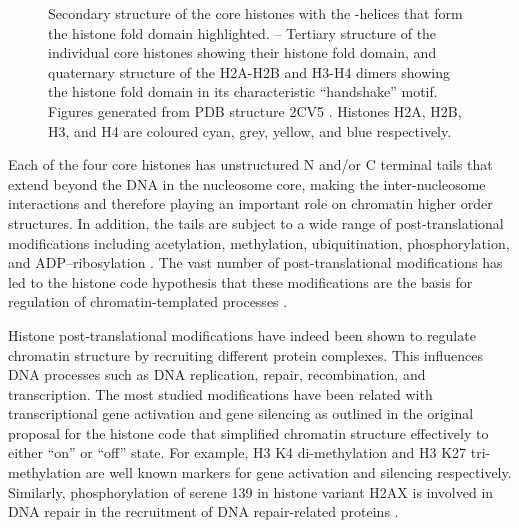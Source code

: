 \begin{figure}
                     {
                       Secondary structure of the core histones with
                       the \textalpha-helices that form the histone
                       fold domain highlighted.
                       --%
                       Tertiary structure of the individual core
                       histones showing their histone fold domain, and
                       quaternary structure of the H2A-H2B and H3-H4
                       dimers showing the histone fold domain in its
                       characteristic ``handshake'' motif.  Figures
                       generated from PDB structure 2CV5
                       \citep{tsunaka2005-2cv5}.  Histones H2A, H2B,
                       H3, and H4 are coloured cyan, grey, yellow, and
                       blue respectively.}
      \end{figure}


      Each of the four core histones has unstructured N and/or C
      terminal tails that extend beyond the DNA in the nucleosome core,
      making the inter-nucleosome interactions and therefore
      playing an important
      role on chromatin higher order structures.
      In addition, the tails are subject to a wide range of
      post-translational modifications
      including acetylation, methylation, ubiquitination, phosphorylation,
      and ADP--ribosylation \citep{bannister2011ptm-review}.
      The vast number of post-translational modifications has led to the
      histone code hypothesis that these modifications are the basis for
      regulation of chromatin-templated processes \citep{jenuwein200histone-code}.


      Histone post-translational modifications have indeed been shown to
      regulate chromatin structure
      by recruiting different protein complexes.
      This influences
      DNA processes such as DNA replication, repair, recombination,
      and transcription.
      The most studied modifications have been related with transcriptional
      gene activation and gene silencing as outlined in
      the original proposal for the histone code \citep{jenuwein200histone-code}
      that simplified chromatin structure
      effectively to either ``on'' or ``off'' state.
      For example,
      H3 K4 di-methylation and H3 K27 tri-methylation are well known
      markers for gene activation and silencing respectively.
      Similarly,
      phosphorylation of serene 139 in histone variant H2AX
      is involved in DNA repair
      in the recruitment of DNA repair-related proteins
      \citep{our-H2AX-review}.

